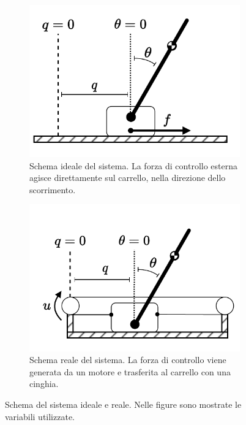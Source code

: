 \begin{figure}[h]
    \centering
    \begin{subfigure}[b]{0.4\textwidth}
        \centering
        \includegraphics[width=\textwidth]{assets/pic}
        \caption{Schema ideale del sistema. La forza di controllo esterna
        agisce direttamente sul carrello, nella direzione dello scorrimento.}
        \label{fig:pic}
    \end{subfigure}
    \hfill
    \begin{subfigure}[b]{0.48\textwidth}
        \centering
        \includegraphics[width=\textwidth]{assets/pic-real}
        \caption{Schema reale del sistema. La forza di controllo viene
        generata da un motore e trasferita al carrello con una cinghia.}
        \label{fig:pic-real}
    \end{subfigure}
    \caption{Schema del sistema ideale e reale. Nelle figure sono mostrate le variabili
    utilizzate.}
\end{figure}



